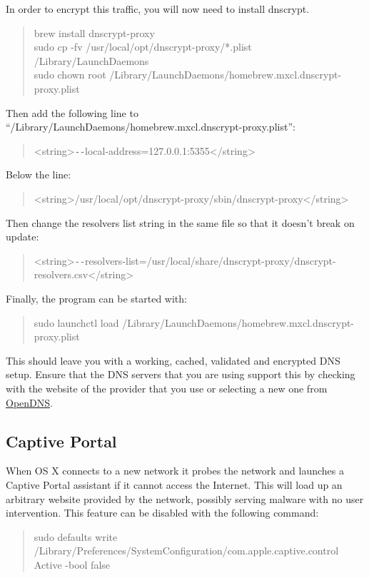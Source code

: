 \documentclass[a4paper,11pt]{report}
\begin{document}
				In order to encrypt this traffic, you will now need to install dnscrypt. 
				\begin{quote}
					brew install dnscrypt-proxy \\
					sudo cp -fv /usr/local/opt/dnscrypt-proxy/*.plist /Library/LaunchDaemons \\
					sudo chown root /Library/LaunchDaemons/homebrew.mxcl.dnscrypt-proxy.plist \\
				\end{quote}
				Then add the following line to ``/Library/LaunchDaemons/homebrew.mxcl.dnscrypt-proxy.plist'':
				\begin{quote}
					<string>\verb+--+local-address=127.0.0.1:5355</string>
				\end{quote}
				Below the line:
				\begin{quote}
					<string>/usr/local/opt/dnscrypt-proxy/sbin/dnscrypt-proxy</string>
				\end{quote}
				Then change the resolvers list string in the same file so that it doesn't break on update:
				\begin{quote}
					<string>\verb+--+resolvers-list=/usr/local/share/dnscrypt-proxy/dnscrypt-resolvers.csv</string>
				\end{quote}
				Finally, the program can be started with:
				\begin{quote}
					sudo launchctl load /Library/LaunchDaemons/homebrew.mxcl.dnscrypt-proxy.plist
				\end{quote}

				This should leave you with a working, cached, validated and encrypted DNS setup. 
				Ensure that the DNS servers that you are using support this by checking with the website of the provider that you use or 
				selecting a new one from \href{https://www.opendns.com/}{OpenDNS}.
				
			\subsection{Captive Portal}
				When OS X connects to a new network it probes the network and launches a Captive Portal assistant if it cannot access the Internet. 
				This will load up an arbitrary website provided by the network, possibly serving malware with no user intervention. 
				This feature can be disabled with the following command:
				\begin{quote}
					sudo defaults write /Library/Preferences/SystemConfiguration/com.apple.captive.control Active -bool false
				\end{quote}
\end{document}
